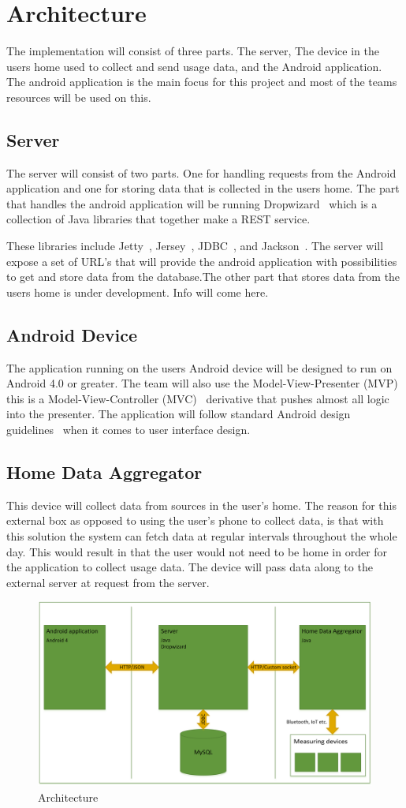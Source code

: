 \newpage
\section{Architecture}
The implementation will consist of three parts. The server, The device in the users home used to 
collect and send usage data, and the Android application. The android application is the main focus for 
this project and most of the teams resources will be used on this.

\subsection{Server}
The server will consist of two parts. One for handling requests from the Android application and one for storing data that is collected in the users home. 
The part that handles the android application will be running Dropwizard~\cite{dropwizard} which is a collection of Java libraries that together make a REST service. 

These libraries include Jetty~\cite{jetty}, Jersey~\cite{jersey}, JDBC~\cite{jdbc}, and Jackson~\cite{jackson}. The server will expose a set of URL’s that will provide the android application with 
possibilities to get and store data from the database.The other part that stores data from the users home is under development. Info will come here.

\subsection{Android Device}
The application running on the users Android device will be designed to run on Android 4.0 or greater.
The team will also use the Model-View-Presenter (MVP)~\cite{mvp} this is a Model-View-Controller (MVC)~\cite{mvc} derivative 
that pushes almost all logic into the presenter. The application will follow standard Android design guidelines~\cite{androidgui}
when it comes to user interface design.

\subsection{Home Data Aggregator}
This device will collect data from sources in the user's home. The reason for this external box as opposed to using 
the user's phone to collect data, is that with this solution the system can fetch data at regular intervals throughout 
the whole day. This would result in that the user would not need to be home in order for the application to collect 
usage data. The device will pass data along to the external server at request from the server.

\begin{figure}[H]
\includegraphics[width=\textwidth]{ch/planning/fig/architecture.png}
\caption{Architecture}
\end{figure}
